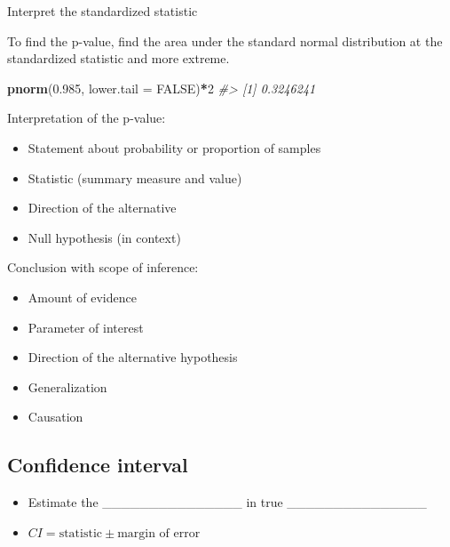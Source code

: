 \documentclass[
]{report}
\newenvironment{Shaded}{\begin{snugshade}}{\end{snugshade}}
\newcommand{\AttributeTok}[1]{\textcolor[rgb]{0.13,0.29,0.53}{#1}}
\newcommand{\CommentTok}[1]{\textcolor[rgb]{0.56,0.35,0.01}{\textit{#1}}}
\newcommand{\ConstantTok}[1]{\textcolor[rgb]{0.56,0.35,0.01}{#1}}
\newcommand{\DecValTok}[1]{\textcolor[rgb]{0.00,0.00,0.81}{#1}}
\newcommand{\FloatTok}[1]{\textcolor[rgb]{0.00,0.00,0.81}{#1}}
\newcommand{\FunctionTok}[1]{\textcolor[rgb]{0.13,0.29,0.53}{\textbf{#1}}}
\newcommand{\NormalTok}[1]{#1}
\newcommand{\SpecialCharTok}[1]{\textcolor[rgb]{0.81,0.36,0.00}{\textbf{#1}}}
\begin{document}
Interpret the standardized statistic

\vspace{0.5in}

To find the p-value, find the area under the standard normal distribution at the standardized statistic and more extreme.

\begin{Shaded}
\begin{Highlighting}[]
\FunctionTok{pnorm}\NormalTok{(}\FloatTok{0.985}\NormalTok{, }\AttributeTok{lower.tail =} \ConstantTok{FALSE}\NormalTok{)}\SpecialCharTok{*}\DecValTok{2}
\CommentTok{\#\textgreater{} [1] 0.3246241}
\end{Highlighting}
\end{Shaded}

Interpretation of the p-value:

\begin{itemize}
\item
  Statement about probability or proportion of samples
\item
  Statistic (summary measure and value)
\item
  Direction of the alternative
\item
  Null hypothesis (in context)
\end{itemize}

\vspace{0.8in}

Conclusion with scope of inference:

\begin{itemize}
\item
  Amount of evidence
\item
  Parameter of interest
\item
  Direction of the alternative hypothesis
\item
  Generalization
\item
  Causation
\end{itemize}

\vspace{0.6in}

\newpage

\hypertarget{confidence-interval-3}{%
\subsection*{Confidence interval}\label{confidence-interval-3}}

\begin{itemize}
\item
  Estimate the \_\_\_\_\_\_\_\_\_\_\_\_\_\_\_ in true \_\_\_\_\_\_\_\_\_\_\_\_\_\_\_
\item
  \(CI = \text{statistic} \pm \text{margin of error}\)
\end{itemize}
\end{document}
